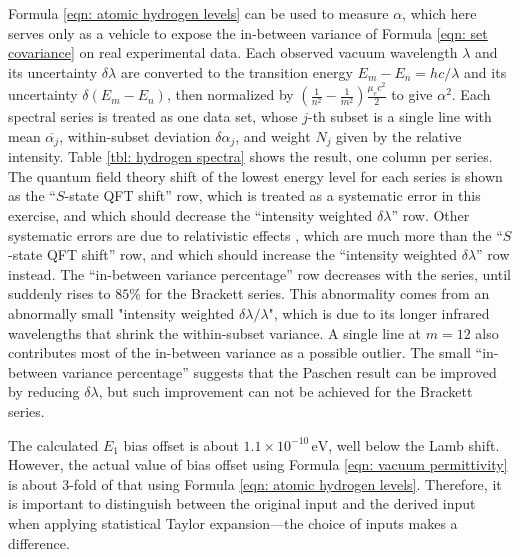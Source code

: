 \documentclass[twoside]{article}
\numberwithin{equation}{section}
\begin{document}
Formula \eqref{eqn: atomic hydrogen levels} can be used to measure $\alpha$, which here serves only as a vehicle to expose the in-between variance of Formula \eqref{eqn: set covariance} on real experimental data.
Each observed vacuum wavelength $\lambda$ and its uncertainty $\delta \lambda$ are converted to the transition energy $E_m - E_n = hc/\lambda$ and its uncertainty $\delta (E_m - E_n)$, then normalized by $\left(\frac{1}{n^2} - \frac{1}{m^2}\right) \frac{\mu_e c^2}{2}$ to give $\alpha^2$.
Each spectral series is treated as one data set, whose $j$-th subset is a single line with mean $\overline{\alpha_j}$, within-subset deviation $\delta \alpha_j$, and weight $N_j$ given by the relative intensity.
Table \ref{tbl: hydrogen spectra} shows the result, one column per series.
The quantum field theory shift of the lowest energy level for each series is shown as the ``$S$-state QFT shift'' row, which is treated as a systematic error in this exercise, and which should decrease the ``intensity weighted $\delta\lambda$'' row.
Other systematic errors are due to relativistic effects \cite{Lamb_Shift}, which are much more than the ``$S$-state QFT shift'' row, and which should increase the ``intensity weighted $\delta\lambda$'' row instead.
The ``in-between variance percentage'' row decreases with the series, until suddenly rises to $85\%$ for the Brackett series.
This abnormality comes from an abnormally small "intensity weighted $\delta\lambda/\lambda$", which is due to its longer infrared wavelengths that shrink the within-subset variance. 
A single line at $m=12$ also contributes most of the in-between variance as a possible outlier.
The small ``in-between variance percentage'' suggests that the Paschen result can be improved by reducing $\delta \lambda$, but such improvement can not be achieved for the Brackett series.

The calculated $E_1$ bias offset is about $1.1\times10^{-10}\,\mathrm{eV}$, well below the Lamb shift.
However, the actual value of bias offset using Formula \eqref{eqn: vacuum permittivity} is about 3-fold of that using Formula \eqref{eqn: atomic hydrogen levels}.
Therefore, it is important to distinguish between the original input and the derived input when applying statistical Taylor expansion---the choice of inputs makes a difference.
\end{document}

